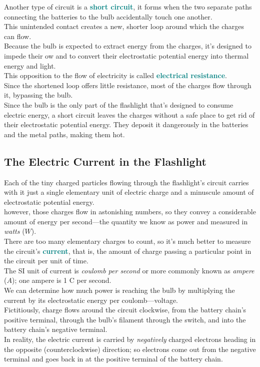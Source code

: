 \documentclass[12pt]{article}
\theoremstyle{definition}
\newcommand{\defnterm}[1]{\textbf{\textcolor{teal}{#1}}\index{#1}}
\begin{document}
Another type of circuit is a \defnterm{short circuit}, it forms when the two separate paths connecting the batteries to the bulb accidentally touch one another. \\
This unintended contact creates a new, shorter loop around which the charges can flow. \\
Because the bulb is expected to extract energy from the charges, it's designed to impede their  ow and to convert their electrostatic potential energy into thermal energy and light. \\
This opposition to the flow of electricity is called \defnterm{electrical resistance}. \\
Since the shortened loop offers little resistance, most of the charges flow through it, bypassing the bulb. \\
Since the bulb is the only part of the flashlight that's designed to consume electric energy, a short circuit leaves the charges without a safe place to get rid of their electrostatic potential energy.
They deposit it dangerously in the batteries and the metal paths, making them hot.

\subsection{The Electric Current in the Flashlight}
Each of the tiny charged particles flowing through the flashlight's circuit carries with it just a single elementary unit of electric charge and a minuscule amount of electrostatic potential energy. \\
however, those charges flow in astonishing numbers, so they convey a considerable amount of energy per second---the quantity we know as power and measured in \emph{watts} ($W$). \\

There are too many elementary charges to count, so it's much better to measure the circuit's \defnterm{current}, that is, the amount of charge passing a particular point in the circuit per unit of time. \\
The SI unit of current is \emph{coulomb per second} or more commonly known as \emph{ampere} ($A$);
one ampere is 1 C per second. \\
We can determine how much power is reaching the bulb by multiplying the current by its electrostatic energy per coulomb---voltage. \\

Fictitiously, charge flows around the circuit clockwise, from the battery chain's positive terminal, through the bulb's filament through the switch, and into the battery chain's negative terminal. \\
In reality, the electric current is carried by \emph{negatively} charged electrons heading in the opposite (counterclockwise) direction;
so electrons come out from the negative terminal and goes back in at the positive terminal of the battery chain. \\
\end{document}
